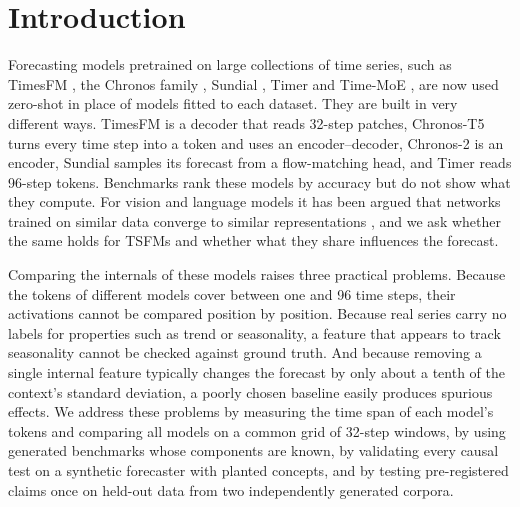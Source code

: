 \documentclass[twoside,11pt]{article}
\begin{document}
\section{Introduction}
\label{sec:intro}

Forecasting models pretrained on large collections of time series, such as TimesFM \citep{das2024timesfm}, the Chronos family \citep{ansari2024chronos,ansari2025chronos2}, Sundial \citep{liu2025sundial}, Timer \citep{liu2024timer} and Time-MoE \citep{shi2025timemoe}, are now used zero-shot in place of models fitted to each dataset.
They are built in very different ways.
TimesFM is a decoder that reads 32-step patches, Chronos-T5 turns every time step into a token and uses an encoder--decoder, Chronos-2 is an encoder, Sundial samples its forecast from a flow-matching head, and Timer reads 96-step tokens.
Benchmarks rank these models by accuracy but do not show what they compute.
For vision and language models it has been argued that networks trained on similar data converge to similar representations \citep{li2016convergent,huh2024platonic}, and we ask whether the same holds for TSFMs and whether what they share influences the forecast.

Comparing the internals of these models raises three practical problems.
Because the tokens of different models cover between one and 96 time steps, their activations cannot be compared position by position.
Because real series carry no labels for properties such as trend or seasonality, a feature that appears to track seasonality cannot be checked against ground truth.
And because removing a single internal feature typically changes the forecast by only about a tenth of the context's standard deviation, a poorly chosen baseline easily produces spurious effects.
We address these problems by measuring the time span of each model's tokens and comparing all models on a common grid of 32-step windows, by using generated benchmarks whose components are known, by validating every causal test on a synthetic forecaster with planted concepts, and by testing pre-registered claims once on held-out data from two independently generated corpora.
\end{document}
